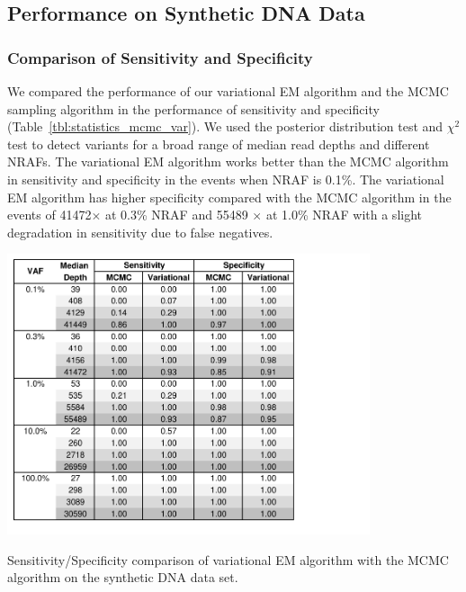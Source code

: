 \documentclass[11pt,reqno]{amsart}
\begin{document}
\subsection{Performance on Synthetic DNA Data}
\subsubsection{Comparison of Sensitivity and Specificity}
We compared the performance of our variational EM algorithm and the MCMC sampling algorithm in the performance of sensitivity and specificity (Table~\ref{tbl:statistics_mcmc_var}).
We used the posterior distribution test and $\chi^2$ test to detect variants for a broad range of median read depths and different NRAFs.
The variational EM algorithm works better than the MCMC algorithm in sensitivity and specificity in the events when NRAF is 0.1\%.
The variational EM algorithm has higher specificity compared with the MCMC algorithm in the events of 41472$\times$ at 0.3\% NRAF and 55489 $\times$ at 1.0\% NRAF with a slight degradation in sensitivity due to false negatives.
\begin{table}[ht]
\centering
\includegraphics[width=0.8\textwidth]{tables/statistics_mcmc_var.pdf}
\caption{Sensitivity/Specificity comparison of variational EM algorithm with the MCMC algorithm on the synthetic DNA data set.}
\label{tbl:statistics_mcmc_var}
\end{table}
\end{document}
